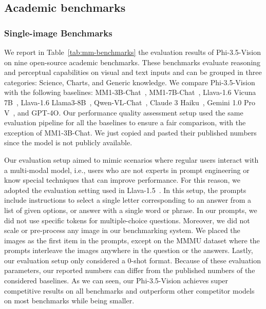 \subsection{Academic benchmarks}

\subsubsection{Single-image Benchmarks}
We report in Table~\ref{tab:mm-benchmarks} the evaluation results of Phi-3.5-Vision on nine open-source academic benchmarks. These benchmarks evaluate reasoning and perceptual capabilities on visual and text inputs and can be grouped in three categories: Science, Charts, and Generic knowledge. We compare Phi-3.5-Vision with the following baselines: MM1-3B-Chat~\cite{mckinzie2024mm1}, MM1-7B-Chat~\cite{mckinzie2024mm1}, Llava-1.6 Vicuna 7B~\cite{liu2023improved}, Llava-1.6 Llama3-8B~\cite{liu2024llavanext}, Qwen-VL-Chat~\cite{bai2023qwenvl}, Claude 3 Haiku~\cite{anthropic2024claude}, Gemini 1.0 Pro V~\cite{team2023gemini}, and GPT-4O. Our performance quality assessment setup used the same evaluation pipeline for all the baselines to ensure a fair comparison, with the exception of MM1-3B-Chat. We just copied and pasted their published numbers since the model is not publicly available.

Our evaluation setup aimed to mimic scenarios where regular users interact with a multi-modal model, i.e., users who are not experts in prompt engineering or know special techniques that can improve performance. For this reason, we adopted the evaluation setting used in Llava-1.5~\cite{liu2023improved}. In this setup, the prompts include instructions to select a single letter corresponding to an answer from a list of given options, or answer with a single word or phrase. In our prompts, we did not use specific tokens for multiple-choice questions. Moreover, we did not scale or pre-process any image in our benchmarking system. We placed the images as the first item in the prompts, except on the MMMU dataset where the prompts interleave the images anywhere in the question or the answers. Lastly, our evaluation setup only considered a 0-shot format. Because of these evaluation parameters, our reported numbers can differ from the published numbers of the considered baselines. As we can seen, our Phi-3.5-Vision achieves super competitive results on all benchmarks and outperform other competitor models on most benchmarks while being smaller.

